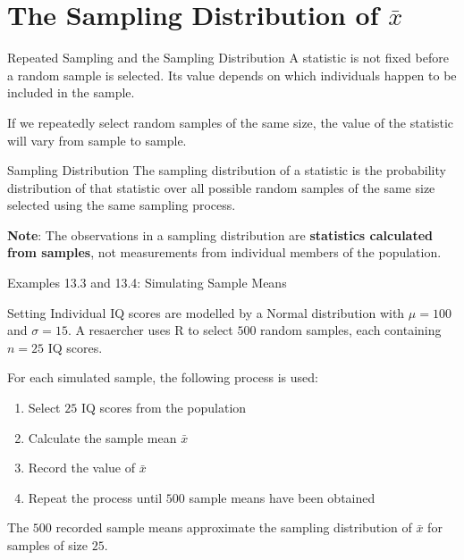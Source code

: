\documentclass[aspectratio=169]{beamer}
\begin{document}
\section{The Sampling Distribution of \texorpdfstring{$\bar{x}$}{xbar}}

\begin{frame}{Repeated Sampling and the Sampling Distribution}
A statistic is not fixed before a random sample is selected. Its value depends on which individuals happen to be included in the sample.

\vspace{0.2cm}
If we repeatedly select random samples of the same size, the value of the statistic will vary from sample to sample.

\begin{block}{Sampling Distribution}
The sampling distribution of a statistic is the probability distribution of that statistic over all possible random samples of the same size selected using the same sampling process.
\end{block}

\textbf{Note}: The observations in a sampling distribution are \textbf{statistics calculated from samples}, not measurements from individual members of the population.
\end{frame}

\begin{frame}{Examples 13.3 and 13.4: Simulating Sample Means}
\begin{block}{Setting}
Individual IQ scores are modelled by a Normal distribution with $\mu=100$ and  $\sigma=15$. A resaercher uses R to select $500$ random samples, each containing $n=25$ IQ scores.
\end{block}

For each simulated sample, the following process is used:
\begin{enumerate}
  \item Select $25$ IQ scores from the population
  \item Calculate the sample mean $\bar{x}$
  \item Record the value of $\bar{x}$
  \item Repeat the process until $500$ sample means have been obtained
\end{enumerate}

The $500$ recorded sample means approximate the sampling distribution of $\bar{x}$ for samples of size $25$.
\end{frame}
\end{document}
